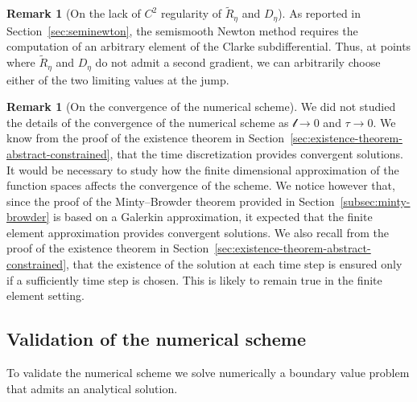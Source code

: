 \documentclass[a4paper,10pt,twoside]{amsbook}
\numberwithin{section}{chapter}
\numberwithin{equation}{chapter}
\theoremstyle{definition}
\newtheorem{rmk}[prop]{Remark}
\begin{document}
\begin{rmk}[On the lack of $C^2$ regularity of $\tilde R_\eta$ and $D_\eta$]
As reported in Section~\ref{sec:seminewton}, the semismooth Newton method requires the computation of an arbitrary element of the Clarke subdifferential. Thus, at points where $\tilde R_\eta $ and $D_\eta$ do not admit a second gradient, we can arbitrarily choose either of the two limiting values at the jump.
\end{rmk}
\begin{rmk}[On the convergence of the numerical scheme]
We did not studied the details of the convergence of the numerical scheme as $\mathscr{l}\to0$ and $\tau\to0$. We know from the proof of the existence theorem in Section~\ref{sec:existence-theorem-abstract-constrained}, that the time discretization provides convergent solutions. It would be necessary to study how the finite dimensional approximation of the function spaces affects the convergence of the scheme. We notice however that, since the proof of the Minty--Browder theorem provided in Section~\ref{subsec:minty-browder} is based on a Galerkin approximation, it expected that the finite element approximation provides convergent solutions. We also recall from the proof of the existence theorem in Section~\ref{sec:existence-theorem-abstract-constrained}, that the existence of the solution at each time step is ensured only if a sufficiently time step is chosen. This is likely to remain true in the finite element setting.
\end{rmk}

\subsection{Validation of the numerical scheme}

To validate the numerical scheme we solve numerically a boundary value problem that admits an analytical solution.
\end{document}
